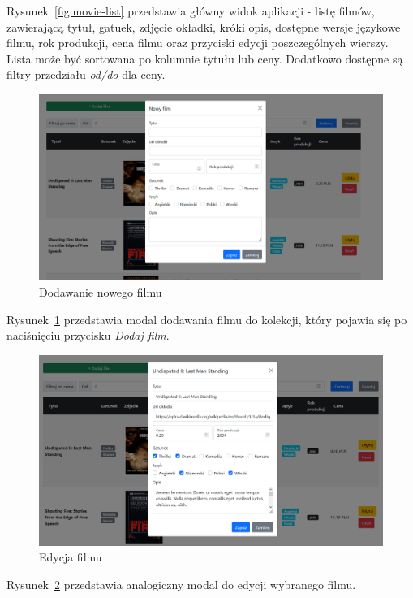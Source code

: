 \documentclass[
    12pt, %
]{fphw}
\begin{document}
    Rysunek~\ref{fig:movie-list} przedstawia główny widok aplikacji - listę filmów, zawierającą tytuł,
    gatuek, zdjęcie okładki, króki opis, dostępne wersje językowe filmu, rok produkcji,
    cena filmu oraz przyciski edycji poszczególnych wierszy.
    Lista może być sortowana po kolumnie tytułu lub ceny.
    Dodatkowo dostępne są filtry przedziału \textit{od/do} dla ceny.

    \begin{figure}[H]
        \includegraphics[width=\linewidth]{./assets/2.PNG}
        \caption{Dodawanie nowego filmu}
        \label{fig:add}
    \end{figure}

    Rysunek~\ref{fig:add} przedstawia modal dodawania filmu do kolekcji, który pojawia się po naciśnięciu przycisku
    \textit{Dodaj film}.

    \begin{figure}[H]
        \includegraphics[width=\linewidth]{./assets/3.PNG}
        \caption{Edycja filmu}
        \label{fig:edit}
    \end{figure}

    Rysunek~\ref{fig:edit} przedstawia analogiczny modal do edycji wybranego filmu.

    \lstlistoflistings
    \listoffigures
    \listoftables
\end{document}
